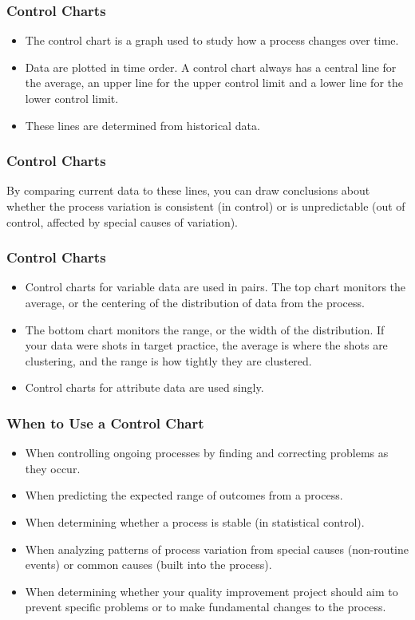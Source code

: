 \documentclass{beamer}
\begin{document}
\begin{frame}
\frametitle{Control Charts}
\begin{itemize}
\item The control chart is a graph used to study how a process changes over time. 
\item Data are plotted in time order. A control chart always has a central line for the average, an upper line for the upper control limit and a lower line for the lower control limit.
\item These lines are determined from historical data.
\end{itemize} 
\end{frame}
\begin{frame}
\frametitle{Control Charts}
By comparing current data to these lines, you can draw conclusions about whether the process variation is consistent (in control) or is unpredictable (out of control, affected by special causes of variation).
\end{frame}
\begin{frame}
\frametitle{Control Charts}
\begin{itemize}
\item Control charts for variable data are used in pairs. The top chart monitors the average, or the centering of the distribution of data from the process. 
\item The bottom chart monitors the range, or the width of the distribution. If your data were shots in target practice, the average is where the shots are clustering, and the range is how tightly they are clustered. 
\item Control charts for attribute data are used singly.
\end{itemize}

\end{frame}
\begin{frame}
\frametitle{When to Use a Control Chart}

\begin{itemize} 
\item When controlling ongoing processes by finding and correcting problems as they occur.
\item When predicting the expected range of outcomes from a process.
\item When determining whether a process is stable (in statistical control).
\item When analyzing patterns of process variation from special causes (non-routine events) or common causes (built into the process).
\item When determining whether your quality improvement project should aim to prevent specific problems or to make fundamental changes to the process.
\end{itemize}
\end{frame}
\end{document}
